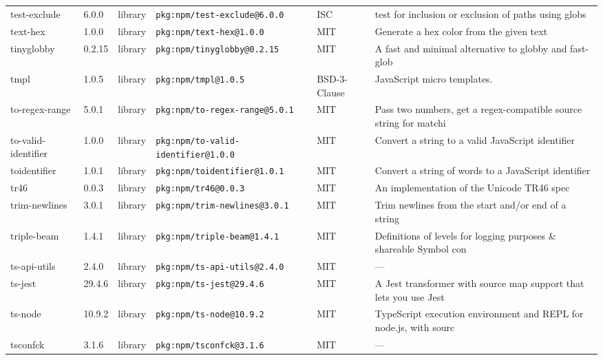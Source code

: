 \documentclass[11pt,a4paper]{article}
\begin{document}
\begin{longtable}{|p{4cm}|p{2cm}|p{1.6cm}|p{5cm}|p{1.5cm}|p{3.5cm}|}
\raggedright test-exclude & 6.0.0 & library & \small\texttt{pkg:npm/test-exclude@6.0.0} & ISC & \small test for inclusion or exclusion of paths using globs \\
\raggedright text-hex & 1.0.0 & library & \small\texttt{pkg:npm/text-hex@1.0.0} & MIT & \small Generate a hex color from the given text \\
\raggedright tinyglobby & 0.2.15 & library & \small\texttt{pkg:npm/tinyglobby@0.2.15} & MIT & \small A fast and minimal alternative to globby and fast-glob \\
\raggedright tmpl & 1.0.5 & library & \small\texttt{pkg:npm/tmpl@1.0.5} & BSD-3-Clause & \small JavaScript micro templates. \\
\raggedright to-regex-range & 5.0.1 & library & \small\texttt{pkg:npm/to-regex-range@5.0.1} & MIT & \small Pass two numbers, get a regex-compatible source string for matchi \\
\raggedright to-valid-identifier & 1.0.0 & library & \small\texttt{pkg:npm/to-valid-identifier@1.0.0} & MIT & \small Convert a string to a valid JavaScript identifier \\
\raggedright toidentifier & 1.0.1 & library & \small\texttt{pkg:npm/toidentifier@1.0.1} & MIT & \small Convert a string of words to a JavaScript identifier \\
\raggedright tr46 & 0.0.3 & library & \small\texttt{pkg:npm/tr46@0.0.3} & MIT & \small An implementation of the Unicode TR46 spec \\
\raggedright trim-newlines & 3.0.1 & library & \small\texttt{pkg:npm/trim-newlines@3.0.1} & MIT & \small Trim newlines from the start and/or end of a string \\
\raggedright triple-beam & 1.4.1 & library & \small\texttt{pkg:npm/triple-beam@1.4.1} & MIT & \small Definitions of levels for logging purposes \& shareable Symbol con \\
\raggedright ts-api-utils & 2.4.0 & library & \small\texttt{pkg:npm/ts-api-utils@2.4.0} & MIT & \small — \\
\raggedright ts-jest & 29.4.6 & library & \small\texttt{pkg:npm/ts-jest@29.4.6} & MIT & \small A Jest transformer with source map support that lets you use Jest \\
\raggedright ts-node & 10.9.2 & library & \small\texttt{pkg:npm/ts-node@10.9.2} & MIT & \small TypeScript execution environment and REPL for node.js, with sourc \\
\raggedright tsconfck & 3.1.6 & library & \small\texttt{pkg:npm/tsconfck@3.1.6} & MIT & \small — \\

\end{longtable}
\end{document}
